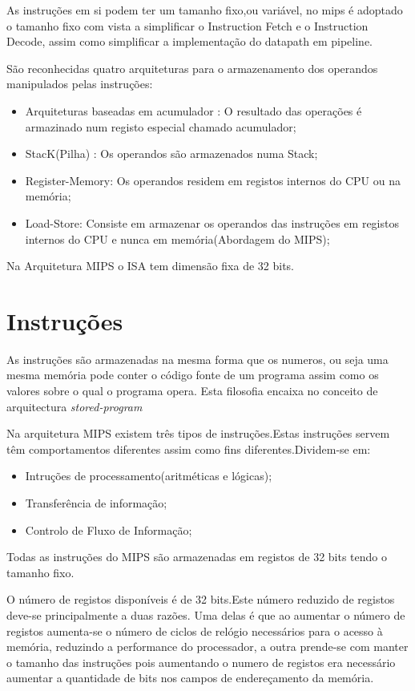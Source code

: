 \documentclass[10pt,a4paper]{book}
\begin{document}
	As instruções em si podem ter um tamanho fixo,ou variável, no mips é adoptado o tamanho fixo com vista a simplificar o Instruction Fetch e o Instruction Decode, assim como simplificar a implementação do datapath em pipeline.

  São reconhecidas quatro arquiteturas para o armazenamento dos operandos manipulados pelas instruções:

	\begin{itemize}
		\item Arquiteturas baseadas em acumulador : O resultado das operações é armazinado num registo especial chamado acumulador;
		\item StacK(Pilha) : Os operandos são armazenados numa Stack;
		\item Register-Memory: Os operandos residem em registos internos do CPU ou na memória;
		\item Load-Store: Consiste em armazenar os operandos das instruções em registos internos do CPU e nunca em memória(Abordagem do MIPS);
	\end{itemize}

	Na Arquitetura MIPS o ISA tem dimensão fixa de 32 bits.

	\section{Instruções}
	As instruções são armazenadas na mesma forma que os numeros, ou seja uma mesma memória pode conter o código fonte de um programa  assim como os valores sobre o qual o programa opera. Esta filosofia encaixa no conceito de arquitectura \textit{stored-program}

	Na arquitetura MIPS existem três tipos de instruções.Estas instruções servem têm comportamentos diferentes assim como fins diferentes.Dividem-se em:
	\begin{itemize}
		\item Intruções de processamento(aritméticas e lógicas);
		\item Transferência de informação;
		\item Controlo de Fluxo de Informação;
	\end{itemize}

	Todas as instruções do MIPS são armazenadas em registos de 32 bits tendo o tamanho fixo.

	O número de registos disponíveis é de 32 bits.Este número reduzido de registos deve-se principalmente a duas razões. Uma delas é que ao aumentar o número de registos aumenta-se o número de	ciclos de relógio necessários para o acesso à memória, reduzindo a performance do processador, a outra prende-se com manter o tamanho das instruções pois aumentando o numero de registos era necessário
	aumentar a quantidade de bits nos campos de endereçamento da memória.
\end{document}
